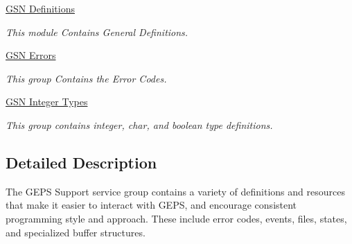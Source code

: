 \begin{DoxyCompactItemize}
\item 
\hyperlink{a00658}{GSN Definitions}


\begin{DoxyCompactList}\small\item\em This module Contains General Definitions. \end{DoxyCompactList}

\item 
\hyperlink{a00659}{GSN Errors}


\begin{DoxyCompactList}\small\item\em This group Contains the Error Codes. \end{DoxyCompactList}

\item 
\hyperlink{a00660}{GSN Integer Types}


\begin{DoxyCompactList}\small\item\em This group contains integer, char, and boolean type definitions. \end{DoxyCompactList}

\end{DoxyCompactItemize}


\subsection{Detailed Description}
The GEPS Support service group contains a variety of definitions and resources that make it easier to interact with GEPS, and encourage consistent programming style and approach. These include error codes, events, files, states, and specialized buffer structures. 